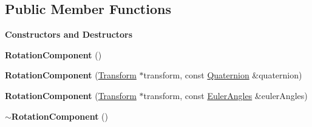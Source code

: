 \subsection*{Public Member Functions}
\begin{Indent}\textbf{ Constructors and Destructors}\par
\begin{DoxyCompactItemize}
\item 
\mbox{\label{classrev_1_1_rotation_component_aa8aa3d29182fcba325799333664fdd5f}} 
{\bfseries Rotation\+Component} ()
\item 
\mbox{\label{classrev_1_1_rotation_component_a2fbdbe1ee2f9a191c4c19666b46c30d3}} 
{\bfseries Rotation\+Component} (\mbox{\hyperlink{classrev_1_1_transform}{Transform}} $\ast$transform, const \mbox{\hyperlink{classrev_1_1_quaternion}{Quaternion}} \&quaternion)
\item 
\mbox{\label{classrev_1_1_rotation_component_a5fd93825650b271efcd9bd3501f3f340}} 
{\bfseries Rotation\+Component} (\mbox{\hyperlink{classrev_1_1_transform}{Transform}} $\ast$transform, const \mbox{\hyperlink{classrev_1_1_euler_angles}{Euler\+Angles}} \&euler\+Angles)
\item 
\mbox{\label{classrev_1_1_rotation_component_a622943409b28e4f2454404e61090b70f}} 
{\bfseries $\sim$\+Rotation\+Component} ()
\end{DoxyCompactItemize}
\end{Indent}
